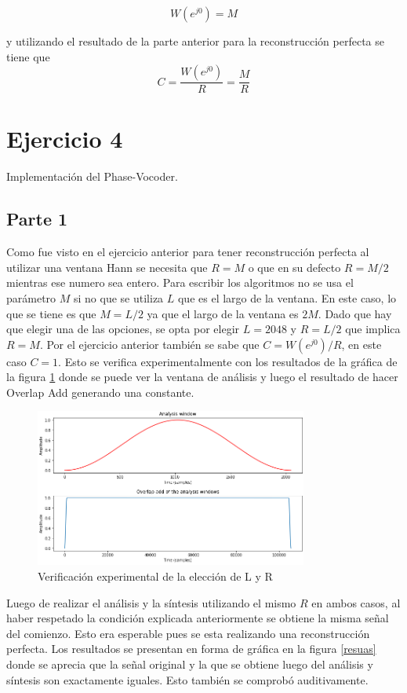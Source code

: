 \documentclass[a4paper]{article}
\begin{document}
$$W(e^{j0}) = M$$

y utilizando el resultado de la parte anterior para la reconstrucción perfecta se tiene que 
$$C = \frac{W(e^{j0})}{R} = \frac{M}{R}$$

\section{Ejercicio 4}
Implementación del Phase-Vocoder.
\subsection{Parte 1}
Como fue visto en el ejercicio anterior para tener reconstrucción perfecta al utilizar una ventana Hann se necesita que $R = M$ o que en su defecto $R = M/2$ mientras ese numero sea entero. Para escribir los algoritmos no se usa el parámetro $M$ si no que se utiliza $L$ que es el largo de la ventana. En este caso, lo que se tiene es que $M = L/2$ ya que el largo de la ventana es $2M$. Dado que hay que elegir una de las opciones, se opta por elegir $L = 2048$ y $R = L / 2$ que implica $R=M$. Por el ejercicio anterior también se sabe que $C = W(e^{j0})/R$, en este caso $C=1$. Esto se verifica experimentalmente con los resultados de la gráfica de la figura \ref{ola} donde se puede ver la ventana de análisis y luego el resultado de hacer Overlap Add generando una constante.

\begin{figure}[h!]
\centering
\includegraphics[width=0.8\textwidth]{resultadola.png}
\caption{Verificación experimental de la elección de L y R}
\label{ola}
\end{figure}

Luego de realizar el análisis y la síntesis utilizando el mismo $R$ en ambos casos, al haber respetado la condición explicada anteriormente se obtiene la misma señal del comienzo. Esto era esperable pues se esta realizando una reconstrucción perfecta. Los resultados se presentan en forma de gráfica en la figura \ref{resuas} donde se aprecia que la señal original y la que se obtiene luego del análisis y síntesis son exactamente iguales. Esto también se comprobó auditivamente. 
\end{document}
